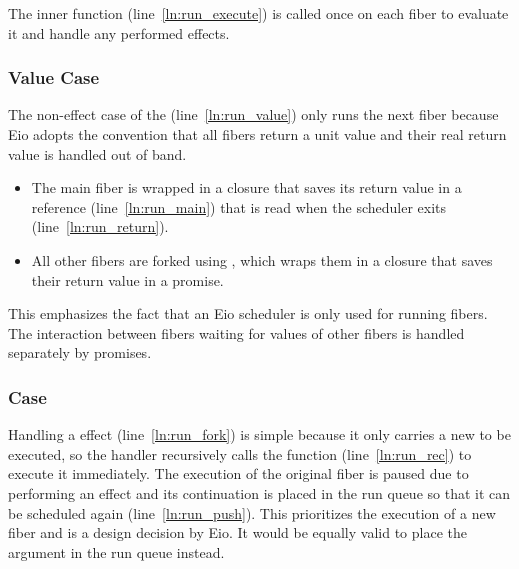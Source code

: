 The inner  function (line~\ref{ln:run_execute}) is called once on each fiber to evaluate it and handle any performed effects.
\subsubsection*{Value Case}
The non-effect case of the  (line~\ref{ln:run_value}) only runs the next fiber because Eio adopts the convention that all fibers return a unit value and their real return value is handled out of band.
\begin{itemize}
  \item The main fiber is wrapped in a closure that saves its return value in a reference (line~\ref{ln:run_main}) that is read when the scheduler exits (line~\ref{ln:run_return}).
  \item All other fibers are forked using , which wraps them in a closure that saves their return value in a promise.
\end{itemize}

This emphasizes the fact that an Eio scheduler is only used for running fibers.
The interaction between fibers waiting for values of other fibers is handled separately by promises.

\subsubsection*{\efork{} Case}
Handling a \efork{} effect (line~\ref{ln:run_fork}) is simple because it only carries a new  to be executed, so the handler recursively calls the  function (line~\ref{ln:run_rec}) to execute it immediately.
The execution of the original fiber is paused due to performing an effect and its continuation  is placed in the run queue so that it can be scheduled again (line~\ref{ln:run_push}).
This prioritizes the execution of a new fiber and is a design decision by Eio.
It would be equally valid to place the  argument in the run queue instead.

